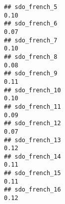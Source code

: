 \documentclass[
]{article}
\begin{document}
\begin{verbatim}
## sdo_french_5                                                                                                                                                                                                                 0.10
## sdo_french_6                                                                                                                                                                                                                 0.07
## sdo_french_7                                                                                                                                                                                                                 0.10
## sdo_french_8                                                                                                                                                                                                                 0.08
## sdo_french_9                                                                                                                                                                                                                 0.11
## sdo_french_10                                                                                                                                                                                                                0.10
## sdo_french_11                                                                                                                                                                                                                0.09
## sdo_french_12                                                                                                                                                                                                                0.07
## sdo_french_13                                                                                                                                                                                                                0.12
## sdo_french_14                                                                                                                                                                                                                0.11
## sdo_french_15                                                                                                                                                                                                                0.11
## sdo_french_16                                                                                                                                                                                                                0.12

\end{verbatim}
\end{document}
